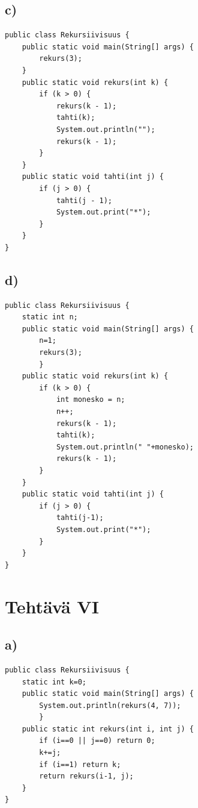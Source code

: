 \documentclass[a4paper, 12pt]{article}
\begin{document}
\subsection*{c)}
\begin{lstlisting}
public class Rekursiivisuus {
    public static void main(String[] args) {
        rekurs(3);
    }
    public static void rekurs(int k) {
        if (k > 0) {
            rekurs(k - 1);
            tahti(k);
            System.out.println("");
            rekurs(k - 1);
        }
    }
    public static void tahti(int j) {
        if (j > 0) {
            tahti(j - 1);
            System.out.print("*");
        }
    }
}
\end{lstlisting}
\subsection*{d)}
\begin{lstlisting}
public class Rekursiivisuus {
    static int n;
    public static void main(String[] args) {
        n=1;
        rekurs(3);
        }
    public static void rekurs(int k) {
        if (k > 0) {
            int monesko = n;
            n++;
            rekurs(k - 1);
            tahti(k);
            System.out.println(" "+monesko);
            rekurs(k - 1);
        }
    }
    public static void tahti(int j) {
        if (j > 0) {
            tahti(j-1);
            System.out.print("*");
        }
    }
}
\end{lstlisting}
\newpage
\section*{Tehtävä VI}
\subsection*{a)}
\begin{lstlisting}
public class Rekursiivisuus {
    static int k=0;
    public static void main(String[] args) {
        System.out.println(rekurs(4, 7));
        }
    public static int rekurs(int i, int j) {
        if (i==0 || j==0) return 0;
        k+=j;
        if (i==1) return k;
        return rekurs(i-1, j);
    }
}
\end{lstlisting}

\fi
\end{document}
